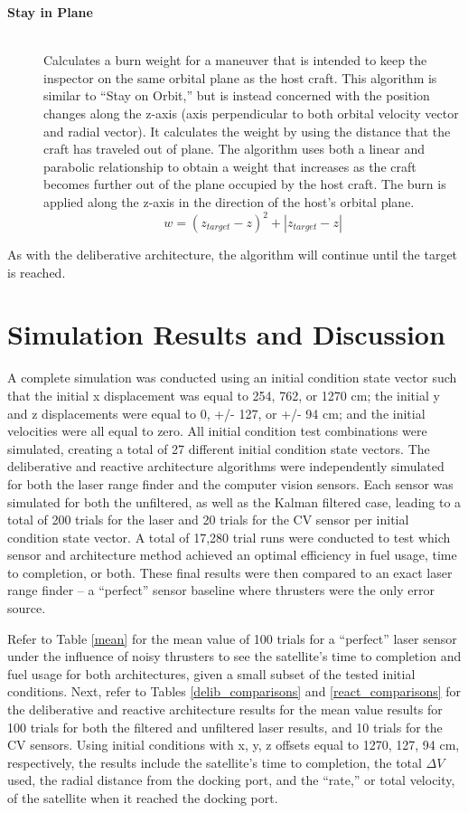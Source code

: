 \documentclass[journal, 10pt]{IEEEtran}
\begin{document}
\begin{description}
\item[\textbf{Stay in Plane}] \hfill \\
Calculates a burn weight for a maneuver that is intended to keep the inspector on the same orbital plane as the host craft.  This algorithm is similar to ``Stay on Orbit,'' but is instead concerned with the position changes along the z-axis (axis perpendicular to both orbital velocity vector and radial vector).  It calculates the weight by using the distance that the craft has traveled out of plane.  The algorithm uses both a linear and parabolic relationship to obtain a weight that increases as the craft becomes further out of the plane occupied by the host craft.  The burn is applied along the z-axis in the direction of the host's orbital plane.
\begin{equation}
w = (z_{target}-z)^2+|z_{target}-z|
\end{equation}
\end{description}

As with the deliberative architecture, the algorithm will continue until the target is reached.

\section{Simulation Results and Discussion} \label{discuss}
A complete simulation was conducted using an initial condition state vector such that the initial x displacement was equal to 254, 762, or 1270 cm; the initial y and z displacements were equal to 0, +/- 127, or +/- 94 cm; and the initial velocities were all equal to zero. All initial condition test combinations were simulated, creating a total of 27 different initial condition state vectors. The deliberative and reactive architecture algorithms were independently simulated for both the laser range finder and the computer vision sensors. Each sensor was simulated for both the unfiltered, as well as the Kalman filtered case, leading to a total of 200 trials for the laser and 20 trials for the CV sensor per initial condition state vector. A total of 17,280 trial runs were conducted to test which sensor and architecture method achieved an optimal efficiency in fuel usage, time to completion, or both. These final results were then compared to an exact laser range finder -- a ``perfect'' sensor baseline where thrusters were the only error source. 

Refer to Table \ref{mean} for the mean value of 100 trials for a ``perfect'' laser sensor under the influence of noisy thrusters to see the satellite's time to completion and fuel usage for both architectures, given a small subset of the tested initial conditions. Next, refer to Tables \ref{delib_comparisons} and \ref{react_comparisons} for the deliberative and reactive architecture results for the mean value results for 100 trials for both the filtered and unfiltered laser results, and 10 trials for the CV sensors. Using initial conditions with x, y, z offsets equal to 1270, 127, 94 cm, respectively, the results include the satellite's time to completion, the total $\Delta V$ used, the radial distance from the docking port, and the ``rate,'' or total velocity, of the satellite when it reached the docking port. 
\end{document}
